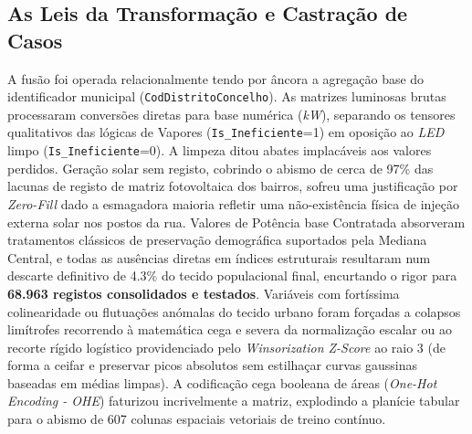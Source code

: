 \documentclass[conference]{IEEEtran}
\begin{document}
\subsection{As Leis da Transformação e Castração de Casos}
A fusão foi operada relacionalmente tendo por âncora a agregação base do identificador municipal (\texttt{CodDistritoConcelho}). As matrizes luminosas brutas processaram conversões diretas para base numérica (\textit{kW}), separando os tensores qualitativos das lógicas de Vapores (\texttt{Is\_Ineficiente}=1) em oposição ao \textit{LED} limpo (\texttt{Is\_Ineficiente}=0).
A limpeza ditou abates implacáveis aos valores perdidos. Geração solar sem registo, cobrindo o abismo de cerca de 97\% das lacunas de registo de matriz fotovoltaica dos bairros, sofreu uma justificação por \textit{Zero-Fill} dado a esmagadora maioria refletir uma não-existência física de injeção externa solar nos postos da rua. Valores de Potência base Contratada absorveram tratamentos clássicos de preservação demográfica suportados pela Mediana Central, e todas as ausências diretas em índices estruturais resultaram num descarte definitivo de 4.3\% do tecido populacional final, encurtando o rigor para \textbf{68.963 registos consolidados e testados}. Variáveis com fortíssima colinearidade ou flutuações anómalas do tecido urbano foram forçadas a colapsos limítrofes recorrendo à matemática cega e severa da normalização escalar ou ao recorte rígido logístico providenciado pelo \textit{Winsorization Z-Score} ao raio 3 (de forma a ceifar e preservar picos absolutos sem estilhaçar curvas gaussinas baseadas em médias limpas). A codificação cega booleana de áreas (\textit{One-Hot Encoding - OHE}) faturizou incrivelmente a matriz, explodindo a planície tabular para o abismo de 607 colunas espaciais vetoriais de treino contínuo.
\end{document}
